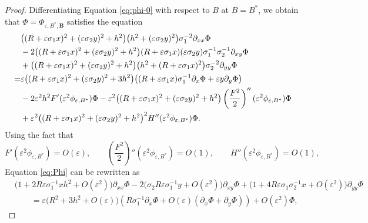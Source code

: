 \documentclass[10pt,a4paper]{amsart}
\begin{document}
\begin{proof}
 

Differentiating Equation \eqref{eq:phi-0}  with respect to $ B $ at $ B = B^* $, we obtain that
$ \Phi=\Phi_{\varepsilon,B^*,\mathbf{B}} $ satisfies the equation 
 \begin{align}\label{eq:Phi}
 &\bigl((R+\varepsilon\sigma_1x)^2+(\varepsilon\sigma_2y)^2+h^2\bigr)\bigl(h^2+(\varepsilon\sigma_2y)^2\bigr)\sigma_1^{-2}\partial_{xx}\Phi \notag\\
 &  -2\bigl((R+\varepsilon\sigma_1x)^2+(\varepsilon\sigma_2y)^2+h^2\bigr)(R+\varepsilon\sigma_1x)(\varepsilon\sigma_2y)
 \sigma_1^{-1}\sigma_2^{-1}\partial_{xy}\Phi \notag\\
 & +\bigl((R+\varepsilon\sigma_1x)^2+(\varepsilon\sigma_2y)^2+h^2\bigr)\bigl(h^2+(R+\varepsilon\sigma_1x)^2\bigr)\sigma_2^{-2}\partial_{yy}\Phi \notag\\
 =&\varepsilon\bigl((R+\varepsilon\sigma_1x)^2+(\varepsilon\sigma_2y)^2+3h^2\bigr)\bigl((R+\varepsilon\sigma_1x)\sigma_1^{-1}\partial_x\Phi+\varepsilon y\partial_y\Phi\bigr)\notag\\
 &
 - 2\varepsilon^2h^2
 F'(\varepsilon^2\phi_{\varepsilon,B^*})\Phi-\varepsilon^2\bigl((R+\varepsilon\sigma_1x)^2+(\varepsilon\sigma_2y)^2+h^2\bigr)
 \left(\frac{F^2}{2}\right)''(\varepsilon^2\phi_{\varepsilon,B^*})\Phi \notag\\
 & +\varepsilon^2\bigl((R+\varepsilon\sigma_1x)^2+(\varepsilon\sigma_2y)^2+h^2\bigr)^2
 H''(\varepsilon^2\phi_{\varepsilon,B^*})\Phi.
 \end{align}
Using the fact that
\begin{equation*}\label{eq:low-regularity-FH}
F'(\varepsilon^2\phi_{\varepsilon,B^*})=O(\varepsilon),
\qquad \left(\frac{F^2}{2}\right)''(\varepsilon^2\phi_{\varepsilon,B^*})=O(1),
\qquad H''(\varepsilon^2\phi_{\varepsilon,B^*})=O(1),
\end{equation*}
Equation \eqref{eq:Phi} can be rewritten as 
\begin{equation*}\label{eq:Phi-expanded-coefficients}
\begin{split}
&\bigl(1+2R\varepsilon\sigma_1^{-1}xh^2+O(\varepsilon^2)\bigr)\partial_{xx}\Phi
-2\bigl(\sigma_2R\varepsilon\sigma_1^{-1}y+O(\varepsilon^2)\bigr)\partial_{xy}\Phi
+\bigl(1+4R\varepsilon\sigma_1\sigma_2^{-1}x+O(\varepsilon^2)\bigr)\partial_{yy}\Phi\\
&\qquad=\varepsilon\bigl(R^2+3h^2+O(\varepsilon)\bigr)\left( R\sigma_1^{-1}\partial_x\Phi
+O(\varepsilon)(\partial_x\Phi+\partial_y\Phi)\right) +O(\varepsilon^2)\Phi,

\end{split}
\end{equation*}
\end{proof}
\end{document}

